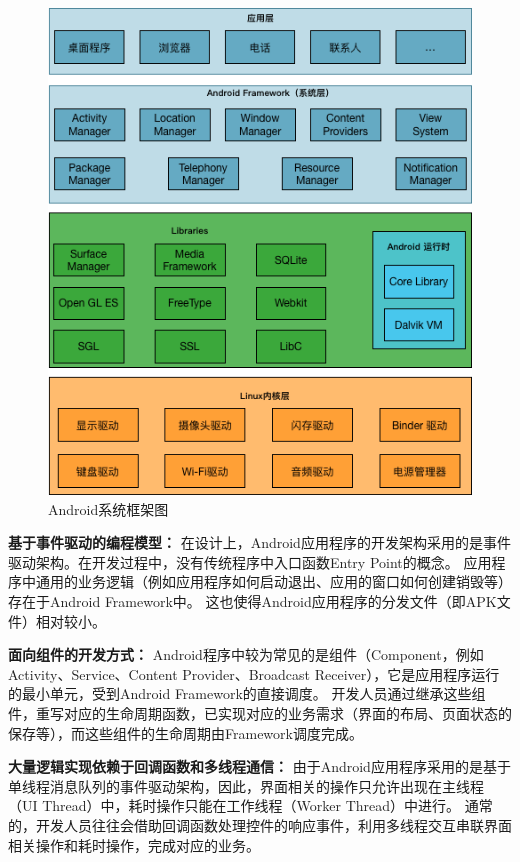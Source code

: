 \begin{figure}
	\centering
	\includegraphics[width=\textwidth]{./Figures/Android-Framework.png}
	\caption{Android系统框架图}
	\label{fig:Android-Framework}
\end{figure}


\textbf{基于事件驱动的编程模型：}
在设计上，Android应用程序的开发架构采用的是事件驱动架构。在开发过程中，没有传统程序中入口函数Entry Point的概念。
应用程序中通用的业务逻辑（例如应用程序如何启动退出、应用的窗口如何创建销毁等）存在于Android Framework中。
这也使得Android应用程序的分发文件（即APK文件）相对较小。

\textbf{面向组件的开发方式：}
Android程序中较为常见的是组件（Component，例如Activity、Service、Content Provider、Broadcast Receiver），它是应用程序运行的最小单元，受到Android Framework的直接调度。
开发人员通过继承这些组件，重写对应的生命周期函数，已实现对应的业务需求（界面的布局、页面状态的保存等），而这些组件的生命周期由Framework调度完成。

\textbf{大量逻辑实现依赖于回调函数和多线程通信：}
由于Android应用程序采用的是基于单线程消息队列的事件驱动架构，因此，界面相关的操作只允许出现在主线程（UI Thread）中，耗时操作只能在工作线程（Worker Thread）中进行。
通常的，开发人员往往会借助回调函数处理控件的响应事件，利用多线程交互串联界面相关操作和耗时操作，完成对应的业务。



